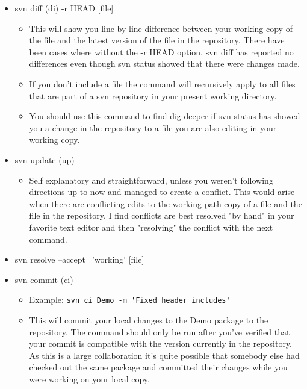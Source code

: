\documentclass[letterpaper,10pt]{article}
\begin{document}
\begin{itemize}
\item svn diff (di) -r HEAD [file]
  \begin{itemize}
  \item This will show you line by line difference between your working copy of the file and the latest version of the file in the repository. There have been cases where without the -r HEAD option, svn diff has reported no differences even though svn status showed that there were changes made.
  \item If you don't include a file the command will recursively apply to all files that are part of a svn repository in your present working directory.
  \item You should use this command to find dig deeper if svn status has showed you a change in the repository to a file you are also editing in your working copy.
  \end{itemize}

\item svn update (up)
  \begin{itemize}
  \item Self explanatory and straightforward, unless you weren't following directions up to now and managed to create a conflict. This would arise when there are conflicting edits to the working path copy of a file and the file in the repository. I find conflicts are best resolved "by hand" in your favorite text editor and then "resolving" the conflict with the next command.
  \end{itemize}

\item svn resolve --accept='working' [file]

\item svn commit (ci)
  \begin{itemize}
  \item Example: \verb|svn ci Demo -m 'Fixed header includes'|
  \item This will commit your local changes to the Demo package to the repository. The command should only be run after you've verified that your commit is compatible with the version currently in the repository. As this is a large collaboration it's quite possible that somebody else had checked out the same package and committed their changes while you were working on your local copy. 
  \end{itemize}


\end{itemize}
\end{document}
